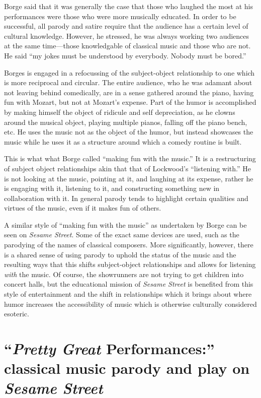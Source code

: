 \documentclass[12pt,letterpaper]{article}
\newcommand{\ses}{\textit{Sesame Street }}
\begin{document}
	Borge said that it was generally the case that those who laughed
	the most at his performances were those who were more musically 
	educated. In order to be successful, all parody and satire require that
	the audience has a certain level of cultural 
	knowledge.\autocite[249]{Garrett} However, he stressed, he was always 
	working two audiences at the same time---those knowledgable of classical
	music and those who are not. He said ``my jokes must be understood by 
	everybody. Nobody must be bored.''\autocite[256]{Garrett} 

 	Borges is engaged in a refocussing of the subject-object 
	relationship to one which is more reciprocal and circular. The entire 
	audience, who he was adamant about not leaving behind comedically, are
	in a sense gathered around the piano, having fun with Mozart, but not at
	Mozart's expense. Part of the humor is accomplished by making himself
	the object of ridicule and self depreciation, as he clowns around the
	musical object, playing multiple pianos, falling off the piano bench,
	etc. He uses the music not as the object of the humor, but instead
	showcases the music while he uses it as a structure
	around which a comedy routine is built. 

	This is what what Borge called ``making fun with the music.'' It is a 
	restructuring
	of subject object relationships akin that that of Lockwood's ``listening
	with.'' He is not looking at the music, pointing at it, and laughing at
	its expense, rather he is engaging with it, listening to it, and 
	constructing something new in collaboration with it. In general parody 
	tends to highlight certain qualities and virtues of the music, even if 
	it makes fun of others. 

	A similar style of ``making fun with the music'' as undertaken by 
	Borge can be seen on \textit{Sesame Street}. Some of the exact same 
	devices are used, such as the parodying of the names of classical 
	composers. More significantly, however, there is a shared sense of using
	parody to uphold the status of the music and the resulting ways that 
	this shifts subject-object relationships and allows for listening 
	\textit{with} the music. Of course, the showrunners are not trying to
	get children into concert halls, but the educational mission of \ses
	is benefited from this style of entertainment and the shift in 
	relationships which it brings about where humor increases the
	accessibility of music which is otherwise culturally considered 
	esoteric.

	\section*{``\textit{Pretty Great} Performances:'' classical music 
	parody and play on \ses}
	
\end{document}
